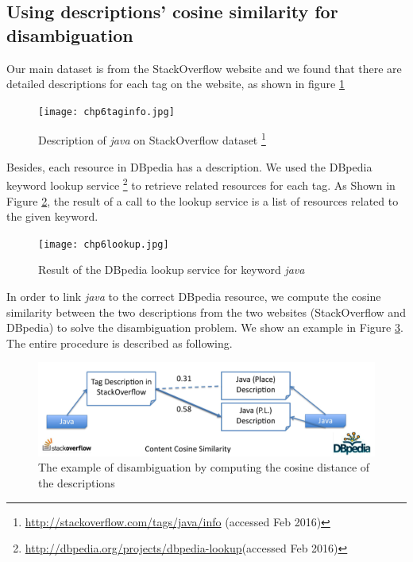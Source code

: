\subsection{Using descriptions' cosine similarity for disambiguation}
Our main dataset is from the StackOverflow website and we found that there are detailed descriptions for each tag on the website, as shown in figure \ref{fig:chp6taginfo}
\begin{figure}[htp]
\centering
\texttt{[image: chp6taginfo.jpg]}  
\caption{Description of \textit{java} on StackOverflow dataset \footnote{\url{http://stackoverflow.com/tags/java/info} (accessed Feb 2016)}}
\label{fig:chp6taginfo} 
\end{figure}

Besides, each resource in DBpedia has a description.  We used the DBpedia keyword lookup service \footnote{\url{http://dbpedia.org/projects/dbpedia-lookup}(accessed Feb 2016)} to retrieve related resources for each tag. As Shown in Figure \ref{fig:chp6lookup}, the result of a call to the lookup service is a list of resources related to the given keyword.

\begin{figure}[htp]
\centering
\texttt{[image: chp6lookup.jpg]}  
\caption{Result of the DBpedia lookup service for keyword \textit{java}}
\label{fig:chp6lookup} 
\end{figure}

In order to link \textit{java} to the correct DBpedia resource, we compute the cosine similarity between the two descriptions from the two websites (StackOverflow and DBpedia) to solve the disambiguation problem. We show an example in Figure \ref{fig:chp6cosine}. The  entire procedure is described as following.

\begin{figure}[htp]
\centering
\includegraphics[width=5in]{chp6cosine.jpg}  
\caption{The example of disambiguation by computing the cosine distance of the descriptions }
\label{fig:chp6cosine} 
\end{figure}



